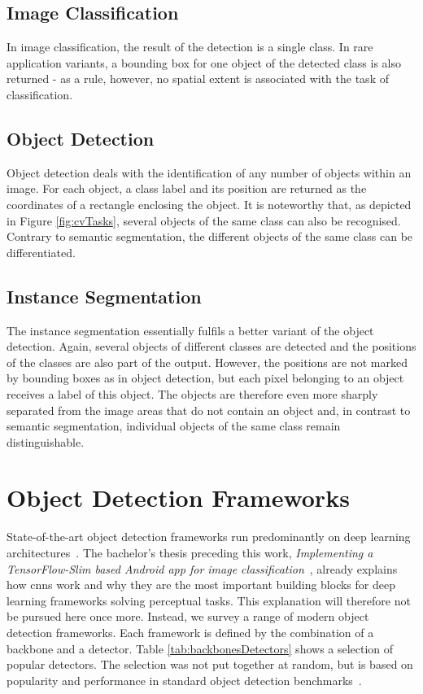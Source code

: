 \documentclass[
			   fontsize=11pt,
               paper=a4,
               bibliography=totoc,
               idxtotoc,
               headsepline,
               footsepline,
               footinclude=false,
               BCOR=12mm,
               DIV=13,
               openany,   %
               oneside    %
               ]
               {scrbook}
\begin{document}
\subsection{Image Classification}
In image classification, the result of the detection is a single class. In rare application variants, a bounding box for one object of the detected class is also returned - as a rule, however, no spatial extent is associated with the task of classification.

\subsection{Object Detection}
Object detection deals with the identification of any number of objects within an image. For each object, a class label and its position are returned as the coordinates of a rectangle enclosing the object. It is noteworthy that, as depicted in Figure \autoref{fig:cvTasks}, several objects of the same class can also be recognised. Contrary to semantic segmentation, the different objects of the same class can be differentiated.

\subsection{Instance Segmentation}
The instance segmentation essentially fulfils a better variant of the object detection. Again, several objects of different classes are detected and the positions of the classes are also part of the output. However, the positions are not marked by bounding boxes as in object detection, but each pixel belonging to an object receives a label of this object. The objects are therefore even more sharply separated from the image areas that do not contain an object and, in contrast to semantic segmentation, individual objects of the same class remain distinguishable.

\section{Object Detection Frameworks}

State-of-the-art object detection frameworks run predominantly on deep learning architectures~\cite{dlForDetection}. The bachelor's thesis preceding this work, \textit{Implementing a TensorFlow-Slim based Android app for image classification}~\cite{maxJokel}, already explains how \glspl{cnn} work and why they are the most important building blocks for deep learning frameworks solving perceptual tasks. This explanation will therefore not be pursued here once more. Instead, we survey a range of modern object detection frameworks. Each framework is defined by the combination of a backbone and a detector. Table \autoref{tab:backbonesDetectors} shows a selection of popular detectors. The selection was not put together at random, but is based on popularity and performance in standard object detection benchmarks~\cite{backbones}. 
\end{document}
